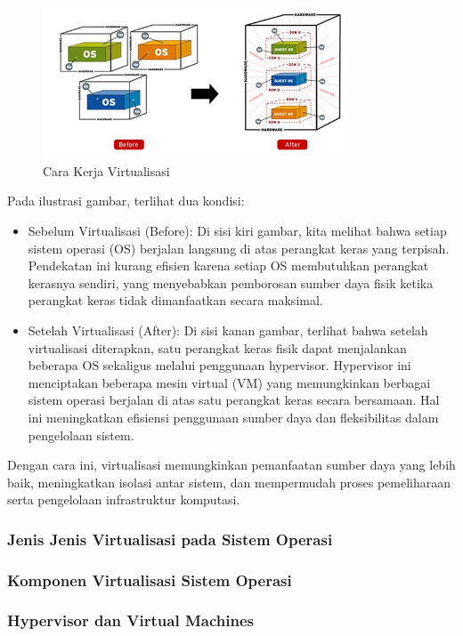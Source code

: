\documentclass[12pt]{article}
\begin{document}
    \begin{figure}[h!]
    \centering
    \includegraphics[width=0.8\textwidth]{carakerjavirtualisasi.jpg}
    \caption{Cara Kerja Virtualisasi}
    \label{fig:label_gambar}
\end{figure}
Pada ilustrasi gambar, terlihat dua kondisi:
\begin{itemize}
    \item Sebelum Virtualisasi (Before): Di sisi kiri gambar, kita melihat bahwa setiap sistem operasi (OS) berjalan langsung di atas perangkat keras yang terpisah. Pendekatan ini kurang efisien karena setiap OS membutuhkan perangkat kerasnya sendiri, yang menyebabkan pemborosan sumber daya fisik ketika perangkat keras tidak dimanfaatkan secara maksimal.
    \item Setelah Virtualisasi (After): Di sisi kanan gambar, terlihat bahwa setelah virtualisasi diterapkan, satu perangkat keras fisik dapat menjalankan beberapa OS sekaligus melalui penggunaan hypervisor. Hypervisor ini menciptakan beberapa mesin virtual (VM) yang memungkinkan berbagai sistem operasi berjalan di atas satu perangkat keras secara bersamaan. Hal ini meningkatkan efisiensi penggunaan sumber daya dan fleksibilitas dalam pengelolaan sistem.
\end{itemize}

Dengan cara ini, virtualisasi memungkinkan pemanfaatan sumber daya yang lebih baik, meningkatkan isolasi antar sistem, dan mempermudah proses pemeliharaan serta pengelolaan infrastruktur komputasi.


\subsubsection{Jenis Jenis Virtualisasi pada Sistem Operasi}
\subsubsection{Komponen Virtualisasi Sistem Operasi}
\subsubsection{Hypervisor dan Virtual Machines}
\end{document}
